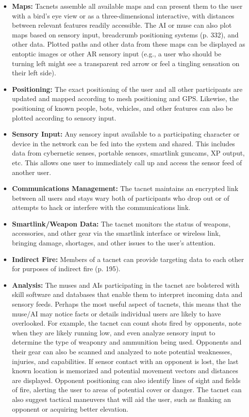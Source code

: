 \begin{itemize} \item \textbf{Maps:} Tacnets assemble all available maps and can present them to the user with a bird’s eye view or as a three-dimensional interactive, with distances between relevant features readily accessible. The AI or muse can also plot maps based on sensory input, breadcrumb positioning systems (p. 332), and other data. Plotted paths and other data from these maps can be displayed as entoptic images or other AR sensory input (e.g., a user who should be turning left might see a transparent red arrow or feel a tingling sensation on their left side). \item \textbf{Positioning:} The exact positioning of the user and all other participants are updated and mapped according to mesh positioning and GPS. Likewise, the positioning of known people, bots, vehicles, and other features can also be plotted according to sensory input. \item \textbf{Sensory Input:} Any sensory input available to a participating character or device in the network can be fed into the system and shared. This includes data from cybernetic senses, portable sensors, smartlink guncams, XP output, etc. This allows one user to immediately call up and access the sensor feed of another user. \item \textbf{Communications Management:} The tacnet maintains an encrypted link between all users and stays wary both of participants who drop out or of attempts to hack or interfere with the communications link. \item \textbf{Smartlink/Weapon Data:} The tacnet monitors the status of weapons, accessories, and other gear via the smartlink interface or wireless link, bringing damage, shortages, and other issues to the user’s attention. \item \textbf{Indirect Fire:} Members of a tacnet can provide targeting data to each other for purposes of indirect fire (p. 195). \item \textbf{Analysis:} The muses and AIs participating in the tacnet are bolstered with skill software and databases that enable them to interpret incoming data and sensory feeds. Perhaps the most useful aspect of tacnets, this means that the muse/AI may notice facts or details individual users are likely to have overlooked. For example, the tacnet can count shots fired by opponents, note when they are likely running low, and even analyze sensory input to determine the type of weaponry and ammunition being used. Opponents and their gear can also be scanned and analyzed to note potential weaknesses, injuries, and capabilities. If sensor contact with an opponent is lost, the last known location is memorized and potential movement vectors and distances are displayed. Opponent positioning can also identify lines of sight and fields of fire, alerting the user to areas of potential cover or danger. The tacnet can also suggest tactical maneuvers that will aid the user, such as flanking an opponent or acquiring better elevation. \end{itemize} 

